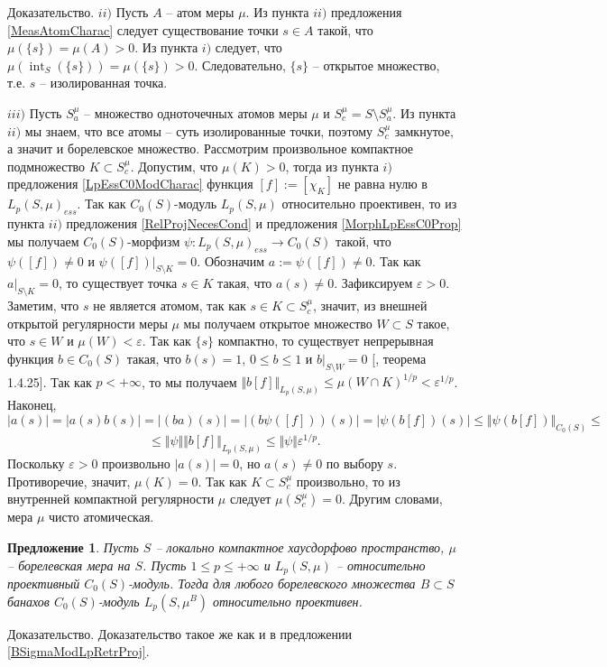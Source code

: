 \documentclass[12pt]{article}
\numberwithin{equation}{subsection}
\theoremstyle{plain}
\newtheorem{proposition}{Предложение}
\newenvironment{proof}{Доказательство.}{}
\begin{document}
\begin{fulltext}
\begin{proof}
        $ii)$ Пусть $A$ -- атом меры $\mu$. Из пункта $ii)$ предложения \ref{MeasAtomCharac} следует существование точки $s\in A$ такой, что $\mu(\{s\})=\mu(A)>0$. Из пункта $i)$ следует, что $\mu(\operatorname{int}_S(\{s\}))=\mu(\{s\})>0$. Следовательно, $\{s\}$ -- открытое множество, т.е. $s$ -- изолированная точка.

        $iii)$ Пусть $S_a^\mu$ -- множество одноточечных атомов меры $\mu$ и $S_c^\mu=S\setminus S_a^\mu$. Из пункта $ii)$ мы знаем, что все атомы -- суть изолированные точки, поэтому $S_c^\mu$ замкнутое, а значит и борелевское множество. Рассмотрим произвольное компактное подмножество $K\subset S_c^\mu$. Допустим, что $\mu(K)>0$, тогда из пункта $i)$ предложения \ref{LpEssC0ModCharac} функция $[f]:=[\chi_K]$ не равна нулю в $L_p(S,\mu)_{ess}$. Так как $C_0(S)$-модуль $L_p(S, \mu)$ относительно проективен, то из пункта $ii)$ предложения \ref{RelProjNecesCond} и предложения \ref{MorphLpEssC0Prop} мы получаем $C_0(S)$-морфизм $\psi:L_p(S,\mu)_{ess}\to C_0(S)$ такой, что $\psi([f])\neq 0$ и $\psi([f])|_{S\setminus K}=0$. Обозначим $a:=\psi([f])\neq 0$. Так как $a|_{S\setminus K}=0$, то существует точка $s\in K$ такая, что $a(s)\neq 0$. Зафиксируем $\varepsilon > 0$. Заметим, что $s$ не является атомом, так как $s\in K\subset S_c^\mu$, значит, из внешней открытой регулярности меры $\mu$ мы получаем открытое множество $W\subset S$ такое, что $s\in W$ и $\mu(W)<\varepsilon$. Так как $\{s\}$ компактно, то существует непрерывная функция $b\in C_0(S)$ такая, что $b(s)=1$, $0\leq b\leq 1$ и $b|_{S\setminus W}=0$ [\cite{DalesBanSpContFunDualSp}, теорема 1.4.25]. Так как $p<+\infty$, то мы получаем $\Vert b[f]\Vert_{L_p(S,\mu)} \leq \mu(W\cap K)^{1/p}<\varepsilon^{1/p}$. Наконец,
        $$
            |a(s)|=|a(s)b(s)|=|(ba)(s)|=|(b\psi([f]))(s)|=|\psi(b[f])(s)|\leq\Vert \psi (b[f])\Vert_{C_0(S)}\leq
        $$
        $$
            \leq\Vert\psi\Vert\Vert b[f]\Vert_{L_p(S,\mu)}\leq\Vert\psi\Vert\varepsilon^{1/p}.
        $$
        Поскольку $\varepsilon>0$ произвольно $|a(s)|=0$, но $a(s)\neq 0$ по выбору $s$. Противоречие, значит, $\mu(K)=0$. Так как $K\subset S_c^\mu$ произвольно, то из внутренней компактной регулярности $\mu$ следует $\mu(S_c^\mu)=0$. Другим словами, мера $\mu$ чисто атомическая.
    \end{proof}

    \begin{proposition}\label{C0ModLpRetrProj} Пусть $S$ -- локально компактное хаусдорфово пространст\-во, $\mu$ -- борелевская мера на $S$. Пусть $1\leq p\leq +\infty$ и $L_p(S,\mu)$ -- относительно проективный $C_0(S)$-модуль. Тогда для любого борелевского множества $B\subset S$ банахов $C_0(S)$-модуль $L_p(S,\mu^B)$ относительно проективен.
    \end{proposition}
    \begin{proof} Доказательство такое же как и в предложении \ref{BSigmaModLpRetrProj}.
    \end{proof}


\end{fulltext}
\end{document}
